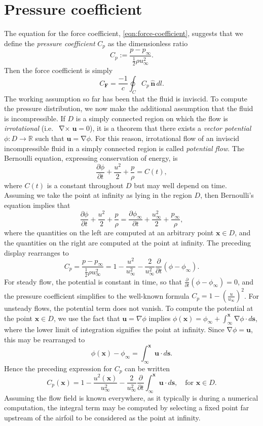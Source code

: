 \documentclass[10pt,fleqn,reqno]{article}
\newcommand\ie{i.e.~}
\newcommand\defn[1]{\emph{#1}}
\newcommand\pd[2]{\frac{\partial #1}{\partial #2}}
\DeclareMathOperator\Grad{\nabla}
\DeclareMathOperator\Curl{\nabla\times}
\begin{document}
\section{Pressure coefficient}
The equation for the force coefficient, \eqref{eqn:force-coefficient}, suggests that we define the \defn{pressure coefficient} $C_p$ as the dimensionless ratio \[C_p:=\frac{p-p_\infty}{\frac{1}{2}\rho u_\infty^2}.\]  Then the force coefficient is simply \[C_{\mathbf F}=\frac{-1}{c}\oint_C C_p\,\hat{\mathbf n}\,dl.\]  The working assumption so far has been that the fluid is inviscid.  To compute the pressure distribution, we now make the additional assumption that the fluid is incompressible.  If $D$ is a simply connected region on which the flow is \defn{irrotational} (\ie $\Curl\mathbf u = 0$), it is a theorem that there exists a \defn{vector potential} $\phi:D\to\mathbb R$ such that $\mathbf u=\Grad\phi$.  For this reason, irrotational flow of an inviscid incompressible fluid in a simply connected region is called \defn{potential flow}.  The Bernoulli equation, expressing conservation of energy, is \[\pd{\phi}{t}+\frac{u^2}{2}+\frac{p}{\rho} = C(t),\] where $C(t)$ is a constant throughout $D$ but may well depend on time.  Assuming we take the point at infinity as lying in the region $D$, then Bernoulli's equation implies that \[\pd{\phi}{t}+\frac{u^2}{2}+\frac{p}{\rho} = \pd{\phi_\infty}{t}+\frac{u_\infty^2}{2}+\frac{p_\infty}{\rho},\] where the quantities on the left are computed at an arbitrary point $\mathbf x\in D$, and the quantities on the right are computed at the point at infinity.  The preceding display rearranges to \[C_p=\frac{p-p_\infty}{\frac{1}{2}\rho u_\infty^2} = 1-\frac{u^2}{u_\infty^2}-\frac{2}{u_\infty^2}\pd{}{t}(\phi-\phi_\infty).\]  For steady flow, the potential is constant in time, so that $\pd{}{t}(\phi-\phi_\infty)=0$, and the pressure coefficient simplifies to the well-known formula $C_p=1-(\frac{u}{u_\infty})^2$.  For unsteady flows, the potential term does not vanish.  To compute the potential at the point $\mathbf x\in D$, we use the fact that $\mathbf u=\nabla\phi$ implies $\phi(\mathbf x) = \phi_\infty + \int_\infty^{\mathbf x}\Grad\phi\cdot d\mathbf s$, where the lower limit of integration signifies the point at infinity.  Since $\Grad\phi = \mathbf u$, this may be rearranged to \[\phi(\mathbf x)-\phi_\infty = \int_\infty^{\mathbf x}\mathbf u\cdot d\mathbf s.\]  Hence the preceding expression for $C_p$ can be written \[C_p(\mathbf x) = 1-\frac{u^2(\mathbf x)}{u_\infty^2}-\frac{2}{u_\infty^2}\pd{}{t}\int_\infty^{\mathbf x}\mathbf u\cdot d\mathbf s,\quad \text{for~}\mathbf x\in D.\]  Assuming the flow field is known everywhere, as it typically is during a numerical computation, the integral term may be computed by selecting a fixed point far upstream of the airfoil to be considered as the point at infinity.
\end{document}
